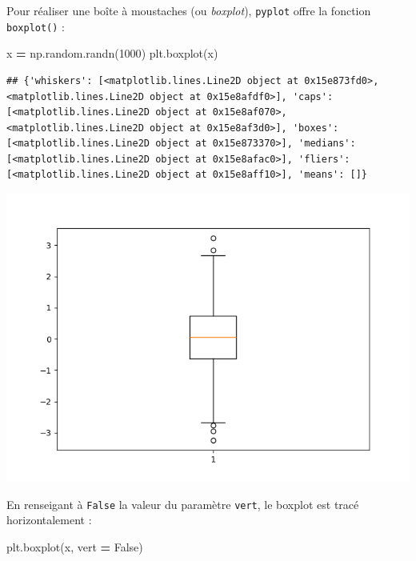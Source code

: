 \documentclass[
  12pt,
]{book}
\newenvironment{Shaded}{\begin{snugshade}}{\end{snugshade}}
\newcommand{\DecValTok}[1]{\textcolor[rgb]{0.00,0.00,0.81}{#1}}
\newcommand{\NormalTok}[1]{#1}
\newcommand{\OperatorTok}[1]{\textcolor[rgb]{0.81,0.36,0.00}{\textbf{#1}}}
\newcommand{\VariableTok}[1]{\textcolor[rgb]{0.00,0.00,0.00}{#1}}
\numberwithin{equation}{section}
\numberwithin{countremarque}{section}
\begin{document}
Pour réaliser une boîte à moustaches (ou \emph{boxplot}), \texttt{pyplot} offre la fonction \texttt{boxplot()} :

\begin{Shaded}
\begin{Highlighting}[]
\NormalTok{x }\OperatorTok{=}\NormalTok{ np.random.randn(}\DecValTok{1000}\NormalTok{)}
\NormalTok{plt.boxplot(x)}
\end{Highlighting}
\end{Shaded}

\begin{lstlisting}
## {'whiskers': [<matplotlib.lines.Line2D object at 0x15e873fd0>, <matplotlib.lines.Line2D object at 0x15e8afdf0>], 'caps': [<matplotlib.lines.Line2D object at 0x15e8af070>, <matplotlib.lines.Line2D object at 0x15e8af3d0>], 'boxes': [<matplotlib.lines.Line2D object at 0x15e873370>], 'medians': [<matplotlib.lines.Line2D object at 0x15e8afac0>], 'fliers': [<matplotlib.lines.Line2D object at 0x15e8aff10>], 'means': []}
\end{lstlisting}

\begin{center}\includegraphics[width=9.03in]{figs/pyplot/boxplot} \end{center}

En renseigant à \texttt{False} la valeur du paramètre \texttt{vert}, le boxplot est tracé horizontalement :

\begin{Shaded}
\begin{Highlighting}[]
\NormalTok{plt.boxplot(x, vert }\OperatorTok{=} \VariableTok{False}\NormalTok{)}
\end{Highlighting}
\end{Shaded}
\end{document}
